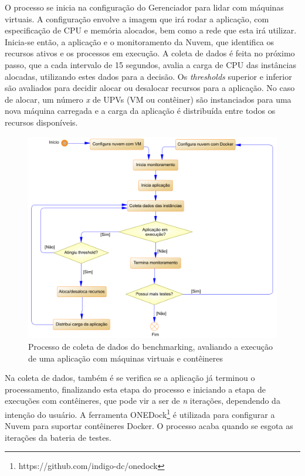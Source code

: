 \documentclass[twoside,english,brazilian]{UNISINOSartigo}
\begin{document}
O processo se inicia na configuração do Gerenciador para lidar com máquinas virtuais. A configuração envolve a imagem que irá rodar a aplicação, com especificação de CPU e memória alocados, bem como a rede que esta irá utilizar. Inicia-se então, a aplicação e o monitoramento da Nuvem, que identifica os recursos ativos e os processos em execução. A coleta de dados é feita no próximo passo, que a cada intervalo de 15 segundos, avalia a carga de CPU das instâncias alocadas, utilizando estes dados para a decisão. Os \textit{thresholds} superior e inferior são avaliados para decidir alocar ou desalocar recursos para a aplicação. No caso de alocar, um número \textit{x} de UPVs (VM ou contêiner) são instanciados para uma nova máquina carregada e a carga da aplicação é distribuída entre todos os recursos disponíveis.

\begin{figure}[ht!]
	\caption{Processo de coleta de dados do benchmarking, avaliando a execução de uma aplicação com máquinas virtuais e contêineres}
	\label{fig:flow}
	\centering%
	\begin{minipage}{0.9\textwidth}
		\includegraphics[width=\textwidth]{images/flow_modelo}
	\end{minipage}
\end{figure}

Na coleta de dados, também é se verifica se a aplicação já terminou o processamento, finalizando esta etapa do processo e iniciando a etapa de execuções com contêineres, que pode vir a ser de \textit{n} iterações, dependendo da intenção do usuário. A ferramenta ONEDock\footnote{https://github.com/indigo-dc/onedock} é utilizada para configurar a Nuvem para suportar contêineres Docker. O processo acaba quando se esgota as iterações da bateria de testes.
\end{document}

